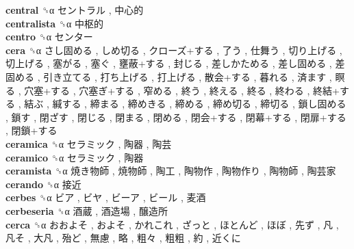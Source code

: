 \textbf{central} ␝α   セントラル ,  中心的   \\
\textbf{centralista} ␝α   中枢的   \\
\textbf{centro} ␝α   センター   \\
\textbf{cera} ␝α   さし固める ,  しめ切る ,  クローズ+する ,  了う ,  仕舞う ,  切り上げる ,  切上げる ,  塞がる ,  塞ぐ ,  壅蔽+する ,  封じる ,  差しかためる ,  差し固める ,  差固める ,  引き立てる ,  打ち上げる ,  打上げる ,  散会+する ,  暮れる ,  済ます ,  瞑る ,  穴塞+する ,  穴塞ぎ+する ,  窄める ,  終う ,  終える ,  終る ,  終わる ,  終結+する ,  結ぶ ,  緘する ,  締まる ,  締めきる ,  締める ,  締め切る ,  締切る ,  鎖し固める ,  鎖す ,  閉ざす ,  閉じる ,  閉まる ,  閉める ,  閉会+する ,  閉幕+する ,  閉扉+する ,  閉鎖+する   \\
\textbf{ceramica} ␝α   セラミック ,  陶器 ,  陶芸   \\
\textbf{ceramico} ␝α   セラミック ,  陶器   \\
\textbf{ceramista} ␝α   焼き物師 ,  焼物師 ,  陶工 ,  陶物作 ,  陶物作り ,  陶物師 ,  陶芸家   \\
\textbf{cerando} ␝α   接近   \\
\textbf{cerbes} ␝α   ビア ,  ビヤ ,  ビーア ,  ビール ,  麦酒   \\
\textbf{cerbeseria} ␝α   酒蔵 ,  酒造場 ,  醸造所   \\
\textbf{cerca} ␝α   おおよそ ,  およそ ,  かれこれ ,  ざっと ,  ほとんど ,  ほぼ ,  先ず ,  凡 ,  凡そ ,  大凡 ,  殆ど ,  無慮 ,  略 ,  粗々 ,  粗粗 ,  約 ,  近くに   \\
